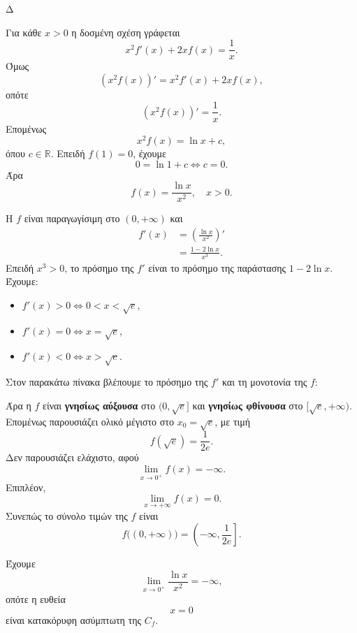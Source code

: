 \begin{thema}{Δ}
\begin{erwthma}
\item Για κάθε $x>0$ η δοσμένη σχέση γράφεται
\[
x^2f'(x)+2xf(x)=\frac{1}{x}.
\]
Όμως
\[
\left(x^2f(x)\right)'=x^2f'(x)+2xf(x),
\]
οπότε
\[
\left(x^2f(x)\right)'=\frac{1}{x}.
\]
Επομένως
\[
x^2f(x)=\ln x+c,
\]
όπου $c\in\mathbb{R}$. Επειδή $f(1)=0$, έχουμε
\[
0=\ln1+c
\Leftrightarrow
c=0.
\]
Άρα
\[
{f(x)=\frac{\ln x}{x^2}},\quad x>0.
\]

\item Η $f$ είναι παραγωγίσιμη στο $(0,+\infty)$ και
\begin{align*}
f'(x)
&=\left(\frac{\ln x}{x^2}\right)'\\
&=\frac{1-2\ln x}{x^3}.
\end{align*}
Επειδή $x^3>0$, το πρόσημο της $f'$ είναι το πρόσημο της παράστασης $1-2\ln x$. Έχουμε:
\begin{itemize}
\item $f'(x)>0\Leftrightarrow 0<x<\sqrt{e}$,
\item $f'(x)=0\Leftrightarrow x=\sqrt{e}$,
\item $f'(x)<0\Leftrightarrow x>\sqrt{e}$.
\end{itemize}
Στον παρακάτω πίνακα βλέπουμε το πρόσημο της $f'$ και τη μονοτονία της $f$:
\begin{center}
\end{center}

Άρα η $f$ είναι \textbf{γνησίως αύξουσα} στο $(0,\sqrt{e}]$ και \textbf{γνησίως φθίνουσα} στο $[\sqrt{e},+\infty)$. Επομένως παρουσιάζει ολικό μέγιστο στο $x_0=\sqrt{e}$, με τιμή
\[
{f(\sqrt{e})=\frac{1}{2e}}.
\]
Δεν παρουσιάζει ελάχιστο, αφού
\[
\lim_{x\to0^+}f(x)=-\infty.
\]
Επιπλέον,
\[
\lim_{x\to+\infty}f(x)=0.
\]
Συνεπώς το σύνολο τιμών της $f$ είναι
\[
{f\big((0,+\infty)\big)
=\left(-\infty,\frac{1}{2e}\right]}.
\]

\item Έχουμε
\[
\lim_{x\to0^+}\frac{\ln x}{x^2}=-\infty,
\]
οπότε η ευθεία
\[
{x=0}
\]
είναι κατακόρυφη ασύμπτωτη της $C_f$.


\end{erwthma}
\end{thema}

